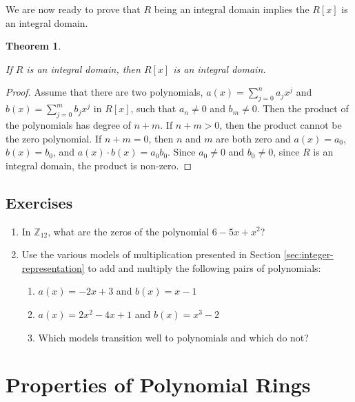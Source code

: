 \documentclass[
]{book}
\providecommand{\tightlist}{%
  \setlength{\itemsep}{0pt}\setlength{\parskip}{0pt}}
\newtheorem{theorem}{Theorem}[chapter]
\theoremstyle{definition}
\theoremstyle{definition}
\theoremstyle{definition}
\theoremstyle{definition}
\theoremstyle{remark}
\begin{document}
We are now ready to prove that \(R\) being an integral domain implies the \(R[x]\) is an integral domain.

\begin{theorem}
\protect\hypertarget{thm:Polynomial-Integral-Domain}{}\label{thm:Polynomial-Integral-Domain}

If \(R\) is an integral domain, then \(R[x]\) is an integral domain.

\end{theorem}

\begin{proof}

Assume that there are two polynomials, \(a(x)=\sum_{j=0}^n a_j x^j\) and \(b(x)=\sum_{j=0}^m b_j x^j\) in \(R[x]\), such that \(a_n\neq 0\) and \(b_m\neq 0\). Then the product of the polynomials has degree of \(n+m\). If \(n+m>0\), then the product cannot be the zero polynomial. If \(n+m=0\), then \(n\) and \(m\) are both zero and \(a(x)=a_0\), \(b(x)=b_0\), and \(a(x)\cdot b(x)=a_0 b_0\). Since \(a_0\neq 0\) and \(b_0\neq 0\), since \(R\) is an integral domain, the product is non-zero.

\end{proof}

\hypertarget{exercises-24}{%
\subsection{Exercises}\label{exercises-24}}

\begin{enumerate}
\def\labelenumi{\arabic{enumi}.}
\item
  In \(\mathbb{Z}_{12}\), what are the zeros of the polynomial \(6-5x+x^2\)?
\item
  Use the various models of multiplication presented in Section \ref{sec:integer-representation} to add and multiply the following pairs of polynomials:

  \begin{enumerate}
  \def\labelenumii{\alph{enumii}.}
  \tightlist
  \item
    \(a(x)=-2x+3\) and \(b(x)=x-1\)
  \item
    \(a(x)=2x^2-4x+1\) and \(b(x)=x^3-2\)
  \item
    Which models transition well to polynomials and which do not?
  \end{enumerate}
\end{enumerate}

\hypertarget{properties-of-polynomial-rings}{%
\section{Properties of Polynomial Rings}\label{properties-of-polynomial-rings}}
\end{document}
